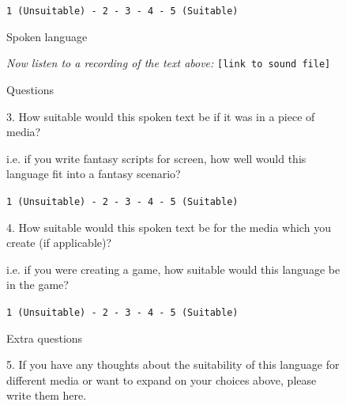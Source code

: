 \documentclass{report}
\begin{document}
\begin{figure}
\begin{tcolorbox}
			\begin{center}
				\texttt{1 (Unsuitable) - 2 - 3 - 4 - 5 (Suitable)}
			\end{center}
		
			\vspace{0.3cm}
		
			\begin{Large}Spoken language\end{Large}
		
			\textit{Now listen to a recording of the text above:} \verb|[link to sound file]|
			
			\vspace{0.3cm}
			
			\begin{Large}Questions\end{Large}
			
			3. How suitable would this spoken text be if it was in a piece of media?
			\begin{small}
				i.e. if you write fantasy scripts for screen, how well would this language fit into a fantasy scenario?
			\end{small}
			
			\begin{center}
				\texttt{1 (Unsuitable) - 2 - 3 - 4 - 5 (Suitable)}
			\end{center}
			
			\vspace{0.3cm}
			
			4. How suitable would this spoken text be for the media which you create (if applicable)?
			\begin{small}
				i.e. if you were creating a game, how suitable would this language be in the game?
			\end{small}
			
			\begin{center}
				\texttt{1 (Unsuitable) - 2 - 3 - 4 - 5 (Suitable)}
			\end{center}
			
			
			\begin{Large}Extra questions\end{Large}
			
			5. If you have any thoughts about the suitability of this language for different media or want to expand on your choices above, please write them here.
			

\end{tcolorbox}
\end{figure}
\end{document}
